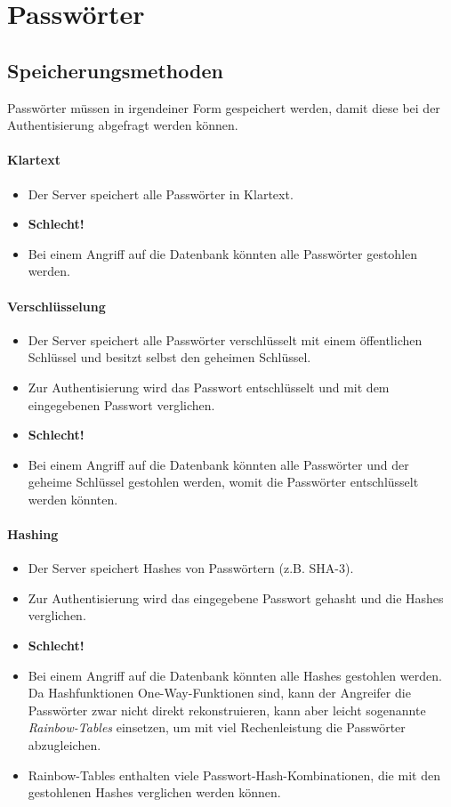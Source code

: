	\section{Passwörter}
		\subsection{Speicherungsmethoden}
			Passwörter müssen in irgendeiner Form gespeichert werden, damit diese bei der Authentisierung abgefragt werden können.

			\paragraph{Klartext}
				\begin{itemize}
					\item Der Server speichert alle Passwörter in Klartext.
					\item \textbf{Schlecht!}
					\item Bei einem Angriff auf die Datenbank könnten alle Passwörter gestohlen werden.
				\end{itemize}

			\paragraph{Verschlüsselung}
				\begin{itemize}
					\item Der Server speichert alle Passwörter verschlüsselt mit einem öffentlichen Schlüssel und besitzt selbst den geheimen Schlüssel.
					\item Zur Authentisierung wird das Passwort entschlüsselt und mit dem eingegebenen Passwort verglichen.
					\item \textbf{Schlecht!}
					\item Bei einem Angriff auf die Datenbank könnten alle Passwörter und der geheime Schlüssel gestohlen werden, womit die Passwörter entschlüsselt werden könnten.
				\end{itemize}

			\paragraph{Hashing}
				\begin{itemize}
					\item Der Server speichert Hashes von Passwörtern (z.B. SHA-3).
					\item Zur Authentisierung wird das eingegebene Passwort gehasht und die Hashes verglichen.
					\item \textbf{Schlecht!}
					\item Bei einem Angriff auf die Datenbank könnten alle Hashes gestohlen werden. Da Hashfunktionen One-Way-Funktionen sind, kann der Angreifer die Passwörter zwar nicht direkt rekonstruieren, kann aber leicht sogenannte \textit{Rainbow-Tables} einsetzen, um mit viel Rechenleistung die Passwörter abzugleichen.
					\item Rainbow-Tables enthalten viele Passwort-Hash-Kombinationen, die mit den gestohlenen Hashes verglichen werden können.
				\end{itemize}

